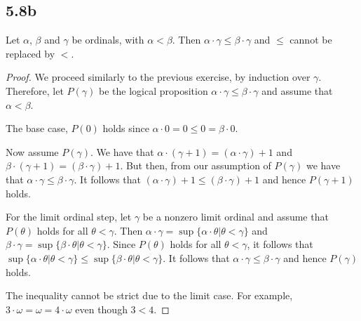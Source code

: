 \subsection*{5.8b} Let $\alpha$, $\beta$ and $\gamma$ be ordinals, with $\alpha < \beta$. Then $\alpha \cdot \gamma \leq \beta \cdot \gamma$ and $\leq$ cannot be replaced by $<$.

\begin{proof}
    We proceed similarly to the previous exercise, by induction over $\gamma$. Therefore, let $P(\gamma)$ be the logical proposition $\alpha \cdot \gamma \leq \beta \cdot \gamma$ and assume that $\alpha < \beta$.
    
    The base case, $P(0)$ holds since $\alpha \cdot 0 = 0 \leq 0 = \beta \cdot 0$.

    Now assume $P(\gamma)$. We have that $\alpha \cdot (\gamma + 1) = (\alpha \cdot \gamma) + 1$ and $\beta \cdot (\gamma + 1) = (\beta \cdot \gamma) + 1$. But then, from our assumption of $P(\gamma)$ we have that $\alpha \cdot \gamma \leq \beta \cdot \gamma$. It follows that $(\alpha \cdot \gamma) + 1 \leq (\beta \cdot \gamma) + 1$ and hence $P(\gamma + 1)$ holds.

    For the limit ordinal step, let $\gamma$ be a nonzero limit ordinal and assume that $P(\theta)$ holds for all $\theta < \gamma$. Then $\alpha \cdot \gamma = \sup\{\alpha \cdot \theta | \theta < \gamma\}$ and $\beta \cdot \gamma = \sup \{\beta \cdot \theta | \theta < \gamma\}$. Since $P(\theta)$ holds for all $\theta < \gamma$, it follows that $\sup\{\alpha \cdot \theta | \theta < \gamma\} \leq \sup \{\beta \cdot \theta | \theta < \gamma\}$. It follows that $\alpha \cdot \gamma \leq \beta \cdot \gamma$ and hence $P(\gamma)$ holds.

    The inequality cannot be strict due to the limit case. For example, $3 \cdot \omega = \omega = 4 \cdot \omega$ even though $3 < 4$.
\end{proof}

